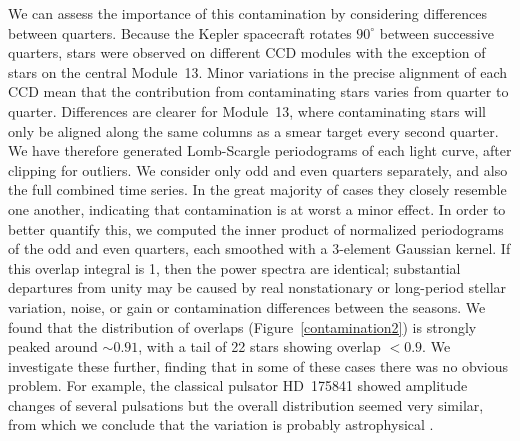 \documentclass[modern]{aastex62}
\newcommand{\kepler}{\textit{Kepler}\xspace}
\begin{document}

We can assess the importance of this contamination by considering differences between quarters. Because the Kepler spacecraft rotates $90^\circ$ between successive quarters, stars were observed on different CCD modules with the exception of stars on the central Module~13. Minor variations in the precise alignment of each CCD mean that the contribution from contaminating stars varies from quarter to quarter. Differences are clearer for Module~13, where contaminating stars will only be aligned along the same columns as a smear target every second quarter. We have therefore generated Lomb-Scargle periodograms \citep{lomb,scargle} of each light curve, after clipping for outliers. We consider only odd and even quarters separately, and also the full combined time series. In the great majority of cases they closely resemble one another, indicating that contamination is at worst a minor effect. In order to better quantify this, we computed the inner product of normalized periodograms of the odd and even quarters, each smoothed with a 3-element Gaussian kernel. If this overlap integral is 1, then the power spectra are identical; substantial departures from unity may be caused by real nonstationary or long-period stellar variation, noise, or gain or contamination differences between the seasons. We found that the distribution of overlaps (Figure~\ref{contamination2}) is strongly peaked around $\sim 0.91$, with a tail of 22 stars showing overlap $< 0.9$. We investigate these further, finding that in some of these cases  there was no obvious problem. For example, the classical pulsator HD~175841 showed amplitude changes of several pulsations but the overall distribution seemed very similar, from which we conclude that the variation is probably astrophysical \citep[as in][]{2016MNRAS.460.1970B}. 
\end{document}
